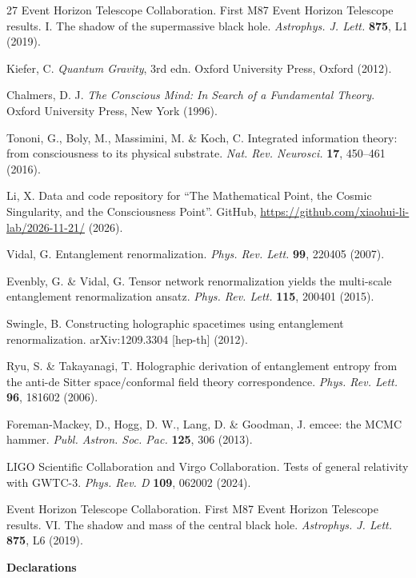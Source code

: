 \documentclass[11pt,a4paper]{article}
\theoremstyle{plain}
\begin{document}
\begin{thebibliography}{27}
Event Horizon Telescope Collaboration. First M87 Event Horizon Telescope results. I. The shadow of the supermassive black hole. \textit{Astrophys. J. Lett.} \textbf{875}, L1 (2019).

Kiefer, C. \textit{Quantum Gravity}, 3rd edn. Oxford University Press, Oxford (2012).

Chalmers, D. J. \textit{The Conscious Mind: In Search of a Fundamental Theory}. Oxford University Press, New York (1996).

Tononi, G., Boly, M., Massimini, M. \& Koch, C. Integrated information theory: from consciousness to its physical substrate. \textit{Nat. Rev. Neurosci.} \textbf{17}, 450--461 (2016).

Li, X. Data and code repository for ``The Mathematical Point, the Cosmic Singularity, and the Consciousness Point''. GitHub, \url{https://github.com/xiaohui-li-lab/2026-11-21/} (2026).

Vidal, G. Entanglement renormalization. \textit{Phys. Rev. Lett.} \textbf{99}, 220405 (2007).

Evenbly, G. \& Vidal, G. Tensor network renormalization yields the multi-scale entanglement renormalization ansatz. \textit{Phys. Rev. Lett.} \textbf{115}, 200401 (2015).

Swingle, B. Constructing holographic spacetimes using entanglement renormalization. arXiv:1209.3304 [hep-th] (2012).

Ryu, S. \& Takayanagi, T. Holographic derivation of entanglement entropy from the anti-de Sitter space/conformal field theory correspondence. \textit{Phys. Rev. Lett.} \textbf{96}, 181602 (2006).

Foreman-Mackey, D., Hogg, D. W., Lang, D. \& Goodman, J. emcee: the MCMC hammer. \textit{Publ. Astron. Soc. Pac.} \textbf{125}, 306 (2013).

LIGO Scientific Collaboration and Virgo Collaboration. Tests of general relativity with GWTC-3. \textit{Phys. Rev. D} \textbf{109}, 062002 (2024).

Event Horizon Telescope Collaboration. First M87 Event Horizon Telescope results. VI. The shadow and mass of the central black hole. \textit{Astrophys. J. Lett.} \textbf{875}, L6 (2019).

\textbf{\textbf{Declarations}}


\end{thebibliography}
\end{document}
